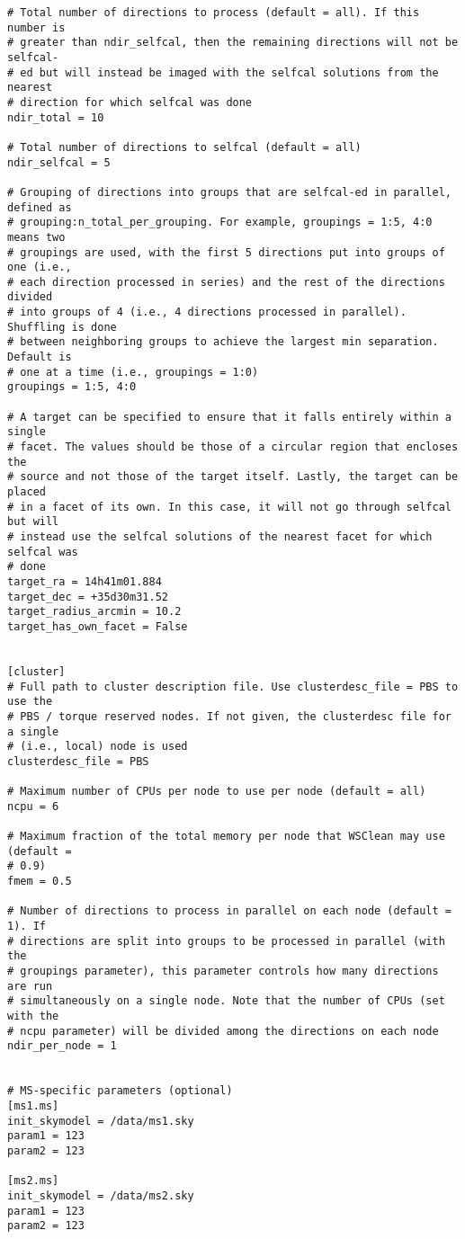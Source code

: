 \documentclass[structabstract]{article}
\begin{document}
\begin{verbatim}
# Total number of directions to process (default = all). If this number is
# greater than ndir_selfcal, then the remaining directions will not be selfcal-
# ed but will instead be imaged with the selfcal solutions from the nearest
# direction for which selfcal was done
ndir_total = 10

# Total number of directions to selfcal (default = all)
ndir_selfcal = 5

# Grouping of directions into groups that are selfcal-ed in parallel, defined as
# grouping:n_total_per_grouping. For example, groupings = 1:5, 4:0 means two
# groupings are used, with the first 5 directions put into groups of one (i.e.,
# each direction processed in series) and the rest of the directions divided
# into groups of 4 (i.e., 4 directions processed in parallel). Shuffling is done
# between neighboring groups to achieve the largest min separation. Default is
# one at a time (i.e., groupings = 1:0)
groupings = 1:5, 4:0

# A target can be specified to ensure that it falls entirely within a single
# facet. The values should be those of a circular region that encloses the
# source and not those of the target itself. Lastly, the target can be placed
# in a facet of its own. In this case, it will not go through selfcal but will
# instead use the selfcal solutions of the nearest facet for which selfcal was
# done
target_ra = 14h41m01.884
target_dec = +35d30m31.52
target_radius_arcmin = 10.2
target_has_own_facet = False


[cluster]
# Full path to cluster description file. Use clusterdesc_file = PBS to use the
# PBS / torque reserved nodes. If not given, the clusterdesc file for a single
# (i.e., local) node is used
clusterdesc_file = PBS

# Maximum number of CPUs per node to use per node (default = all)
ncpu = 6

# Maximum fraction of the total memory per node that WSClean may use (default =
# 0.9)
fmem = 0.5

# Number of directions to process in parallel on each node (default = 1). If
# directions are split into groups to be processed in parallel (with the
# groupings parameter), this parameter controls how many directions are run
# simultaneously on a single node. Note that the number of CPUs (set with the
# ncpu parameter) will be divided among the directions on each node
ndir_per_node = 1


# MS-specific parameters (optional)
[ms1.ms]
init_skymodel = /data/ms1.sky
param1 = 123
param2 = 123

[ms2.ms]
init_skymodel = /data/ms2.sky
param1 = 123
param2 = 123

\end{verbatim}
\end{document}
